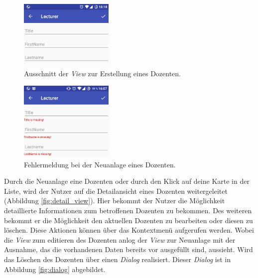 \begin{figure}[H]
	\begin{center}
		\includegraphics[width=0.4\textwidth]{images/input_small.png}
		\caption{Ausschnitt der \textit{View} zur Erstellung eines Dozenten.}
		\label{fig:input_view}
	\end{center}
\end{figure}

\begin{figure}[H]
	\begin{center}
		\includegraphics[width=0.4\textwidth]{images/input_error.png}
		\caption{Fehlermeldung bei der Neuanlage eines Dozenten.}
		\label{fig:input_error}
	\end{center}
\end{figure}

Durch die Neuanlage eine Dozenten oder durch den Klick auf deine Karte in der Liste, wird der Nutzer auf die Detailansicht eines Dozenten weitergeleitet (Abbildung \ref{fig:detail_view}). Hier bekommt der Nutzer die Möglichkeit detaillierte Informationen zum betroffenen Dozenten zu bekommen. Des weiteren bekommt er die Möglichkeit den aktuellen Dozenten zu bearbeiten oder diesen zu löschen. Diese Aktionen können über das Kontextmenü aufgerufen werden. Wobei die \textit{View} zum editieren des Dozenten anlog der \textit{View} zur Neuanlage mit der Ausnahme, das die vorhandenen Daten bereits vor ausgefüllt sind, aussieht. Wird das Löschen des Dozenten über einen \textit{Dialog} realisiert. Dieser \textit{Dialog} ist in Abbildung \ref{fig:dialog} abgebildet.


